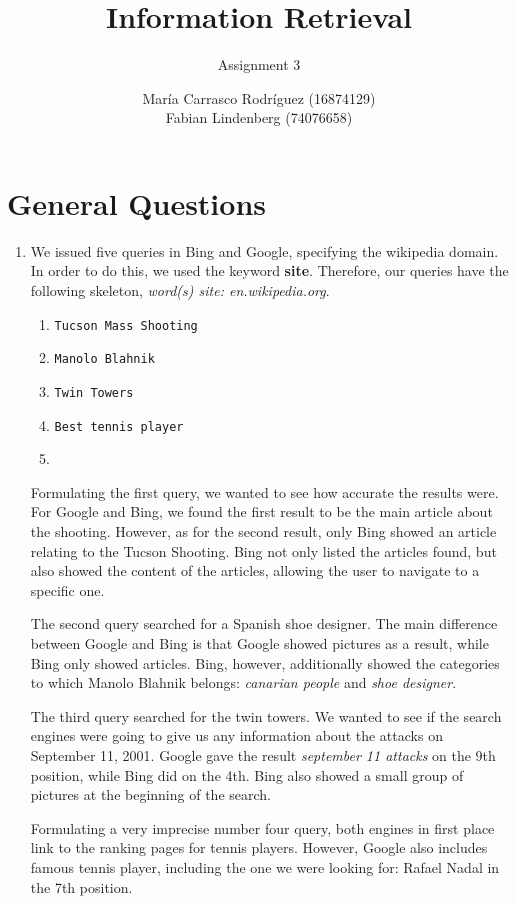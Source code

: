 \documentclass[a4paper,11pt,oneside]{book}
\title{Information Retrieval }
\subtitle{Assignment 3}
\author{ María Carrasco Rodríguez (16874129) \\
		Fabian Lindenberg (74076658)}
\begin{document}
\kostspieligmaketitle

\tableofcontents
\pagebreak

\chapter{General Questions}

\begin{enumerate}\item We issued five queries in Bing and Google, specifying the wikipedia domain. In order to do this, we used the keyword {\bf site}. Therefore, our queries have the following skeleton, {\it word(s) site: en.wikipedia.org}.
		\begin{enumerate}
			\renewcommand{\labelenumii}{\Roman{enumii}}
			\item \texttt{Tucson Mass Shooting}
			\item \texttt{Manolo Blahnik}
			\item \texttt{Twin Towers}
			\item \texttt{Best tennis player}
			\item \texttt{}
		\end{enumerate}
	Formulating the first query, we wanted to see how accurate the results were. For Google and Bing, we found the first result to be the main article about the shooting. However, as for the second result, only Bing showed an article relating to the Tucson Shooting. Bing not only listed the articles found, but also showed the content of the articles, allowing the user to navigate to a specific one.

	The second query searched for a Spanish shoe designer. The main difference between Google and Bing is that Google showed pictures as a result, while Bing only showed articles. Bing, however, additionally showed the categories to which Manolo Blahnik belongs: {\it canarian people} and {\it shoe designer}.

	The third query searched for the twin towers. We wanted to see if the search engines were going to give us any information about the attacks on September 11, 2001. Google gave the result {\it september 11 attacks} on the 9th position, while Bing did on the 4th. Bing also showed a small group of pictures at the beginning of the search.

	Formulating a very imprecise number four query, both engines in first place link to the ranking pages for tennis players. However, Google also includes famous tennis player, including the one we were looking for: Rafael Nadal in the 7th position.


\end{enumerate}
\end{document}

